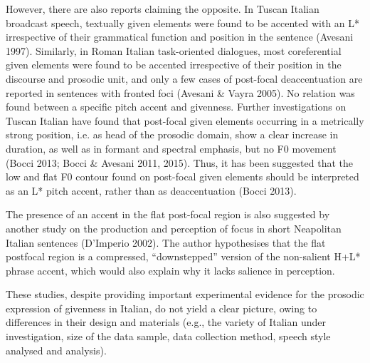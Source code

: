 \begin{styleStandard}
However, there are also reports claiming the opposite. In Tuscan Italian broadcast speech, textually given elements were found to be accented with an L* irrespective of their grammatical function and position in the sentence (Avesani 1997). Similarly, in Roman Italian task-oriented dialogues, most coreferential given elements were found to be accented irrespective of their position in the discourse and prosodic unit, and only a few cases of post-focal deaccentuation are reported in sentences with fronted foci (Avesani \& Vayra 2005). No relation was found between a specific pitch accent and givenness. Further investigations on Tuscan Italian have found that post-focal given elements occurring in a metrically strong position, i.e. as head of the prosodic domain, show a clear increase in duration, as well as in formant and spectral emphasis, but no F0 movement (Bocci 2013; Bocci \& Avesani 2011, 2015). Thus, it has been suggested that the low and flat F0 contour found on post-focal given elements should be interpreted as an L* pitch accent, rather than as deaccentuation (Bocci 2013).
\end{styleStandard}

\begin{styleStandard}
The presence of an accent in the flat post-focal region is also suggested by another study on the production and perception of focus in short Neapolitan Italian sentences (D’Imperio 2002). The author hypothesises that the flat postfocal region is a compressed, “downstepped” version of the non-salient H+L* phrase accent, which would also explain why it lacks salience in perception.
\end{styleStandard}

\begin{styleStandard}
These studies, despite providing important experimental evidence for the prosodic expression of givenness in Italian, do not yield a clear picture, owing to differences in their design and materials (e.g., the variety of Italian under investigation, size of the data sample, data collection method, speech style analysed and analysis). 
\end{styleStandard}

